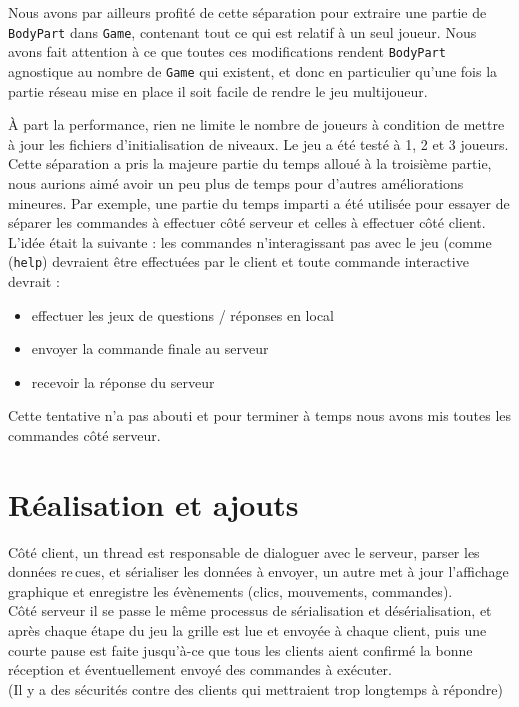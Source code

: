 \documentclass[a4paper,french]{article}
\newcommand{\ttt}[1]{\texttt{#1}}
\begin{document}
Nous avons par ailleurs profité de cette séparation pour extraire une partie de
\ttt{BodyPart} dans \ttt{Game}, contenant tout ce qui est relatif à un seul joueur.
Nous avons fait attention à ce que toutes ces modifications rendent \ttt{BodyPart}
agnostique au nombre de \ttt{Game} qui existent, et donc en particulier qu'une fois la
partie réseau mise en place il soit facile de rendre le jeu multijoueur.

\`A part la performance, rien ne limite le nombre de joueurs à condition de mettre à
jour les fichiers d'initialisation de niveaux. Le jeu a été testé à 1, 2 et 3 joueurs.\\

Cette séparation a pris la majeure partie du temps alloué à la troisième partie,
nous aurions aimé avoir un peu plus de temps pour d'autres améliorations mineures.
Par exemple, une partie du temps imparti a été utilisée pour essayer de séparer les commandes à effectuer côté serveur et celles
à effectuer côté client. L'idée était la suivante : les commandes n'interagissant pas avec le jeu (comme
(\texttt{help}) devraient être effectuées par le client et toute commande interactive devrait :
\begin{itemize}
	\item effectuer les jeux de questions / réponses en local
	\item envoyer la commande finale au serveur
	\item recevoir la réponse du serveur
\end{itemize}
Cette tentative n'a pas abouti et pour terminer à temps nous avons mis toutes les commandes
côté serveur.



\section{Réalisation et ajouts}

Côté client, un thread est responsable de dialoguer avec le serveur, parser les données re\,cues, et
sérialiser les données à envoyer, un autre met à jour l'affichage graphique et enregistre les
évènements (clics, mouvements, commandes).\\

Côté serveur il se passe le même processus de sérialisation et désérialisation, et après chaque
étape du jeu la grille est lue et envoyée à chaque client, puis une courte pause est faite jusqu'à-ce que
tous les clients aient confirmé la bonne réception et éventuellement envoyé des commandes à exécuter.\\
(Il y a des sécurités contre des clients qui mettraient trop longtemps à répondre)\\
\end{document}
